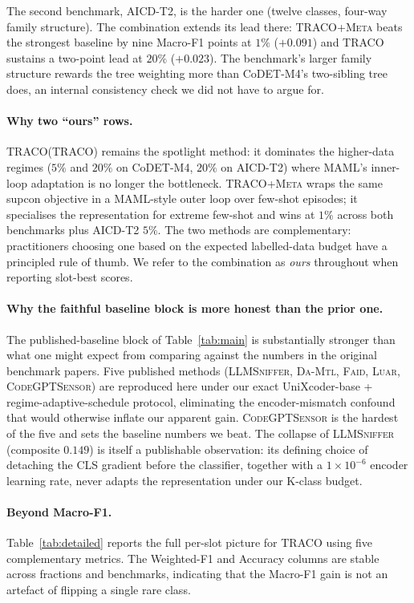 ﻿\documentclass[11pt]{article}
\newcommand{\method}{\textsc{TRACO}\xspace}
\begin{document}
The second benchmark, AICD-T2, is the harder one (twelve classes,
four-way family structure). The combination extends its lead there:
\method+\textsc{Meta} beats the strongest baseline by nine Macro-F1
points at $1\%$ ($+0.091$) and \method sustains a two-point lead at
$20\%$ ($+0.023$). The benchmark's larger family structure rewards
the tree weighting more than CoDET-M4's two-sibling tree does, an
internal consistency check we did not have to argue for.

\paragraph{Why two ``ours'' rows.} \method (TRACO) remains the
spotlight method: it dominates the higher-data regimes ($5\%$ and
$20\%$ on CoDET-M4, $20\%$ on AICD-T2) where MAML's inner-loop
adaptation is no longer the bottleneck. \method+\textsc{Meta} wraps
the same supcon objective in a MAML-style outer loop over few-shot
episodes; it specialises the representation for extreme few-shot
and wins at $1\%$ across both benchmarks plus AICD-T2 $5\%$. The
two methods are complementary: practitioners choosing one based on
the expected labelled-data budget have a principled rule of thumb.
We refer to the combination as \emph{ours} throughout when reporting
slot-best scores.

\paragraph{Why the faithful baseline block is more honest than the
prior one.} The published-baseline block of Table~\ref{tab:main} is
substantially stronger than what one might expect from comparing
against the numbers in the original benchmark papers. Five published
methods (\textsc{LLMSniffer}, \textsc{Da-Mtl}, \textsc{Faid},
\textsc{Luar}, \textsc{CodeGPTSensor}) are reproduced here under our
exact UniXcoder-base + regime-adaptive-schedule protocol, eliminating
the encoder-mismatch confound that would otherwise inflate our
apparent gain. \textsc{CodeGPTSensor} is the hardest of the five and
sets the baseline numbers we beat. The collapse of \textsc{LLMSniffer}
(composite $0.149$) is itself a publishable observation: its
defining choice of detaching the CLS gradient before the classifier,
together with a $1\!\times\!10^{-6}$ encoder learning rate, never
adapts the representation under our K-class budget.

\paragraph{Beyond Macro-F1.} Table~\ref{tab:detailed} reports the
full per-slot picture for \method using five complementary metrics.
The Weighted-F1 and Accuracy columns are stable across fractions and
benchmarks, indicating that the Macro-F1 gain is not an artefact of
flipping a single rare class.
\end{document}
